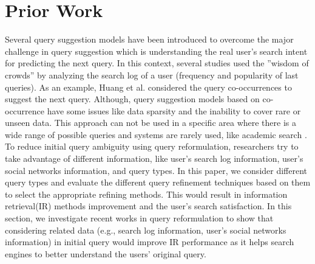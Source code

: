 \documentclass[sigconf]{acmart}
\begin{document}
\section{Prior Work}
Several query suggestion models have been introduced to overcome the major challenge in query suggestion which is understanding the real user’s search intent for predicting the next query. In this context, several studies used the ”wisdom of crowds” by analyzing the search log of a user (frequency and popularity of last queries). As an example, Huang et al. \cite{huang2003relevant} considered the query co-occurrences to suggest the next query. Although, query suggestion models based on co-occurrence have some issues like data sparsity and the inability to cover rare or unseen data. This approach can not be used in a specific area where there is a wide range of possible queries and systems are rarely used, like academic search \cite{lankinen2016character}. To reduce initial query ambiguity using query reformulation, researchers try to take advantage of different information, like user's search log information, user's social networks information, and query types. In this paper, we consider different query types and evaluate the different query refinement techniques based on them to select the appropriate refining methods. This would result in information retrieval(IR) methods improvement and the user's search satisfaction. In this section, we investigate recent works in query reformulation to show that considering related data (e.g., search log information, user's social networks information) in initial query would improve IR performance as it helps search engines to better understand the users' original query.
\vspace{-3pt}
\end{document}
